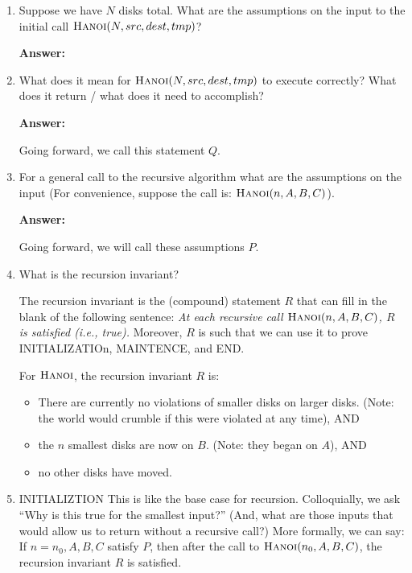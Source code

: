 \documentclass{article}
\newcommand{\answer}{\textbf{Answer:}\vspace{1.8in}}
\begin{document}
\begin{enumerate}
    \item Suppose we have $N$ disks total. What are the assumptions on the input
        to the initial call $\textsc{Hanoi}(N,src,dest,tmp)$?

        \answer

    \item What does it mean for $\textsc{Hanoi}(N,src,dest,tmp)$ to execute
        correctly? What does it return / what does it need to accomplish?

        \answer

        Going forward, we call this statement $Q$.

    \pagebreak
    \item For a general call to the recursive algorithm what are the assumptions on the input
        (For convenience, suppose the call is: $\textsc{Hanoi}(n,A,B,C)$).

        \answer

        Going forward, we will call these assumptions $P$.

    \item What is the recursion invariant?

        The recursion invariant is the (compound) statement $R$ that can fill in
        the blank of the following sentence:
        \emph{At each recursive call $\textsc{Hanoi}(n,A,B,C)$,
        $R$ is satisfied (i.e., true).}  Moreover, $R$ is such that we can use
        it to prove INITIALIZATIOn, MAINTENCE, and END.

        For $\textsc{Hanoi}$, the recursion invariant $R$ is:
        \begin{itemize}
            \item There are currently no violations of smaller disks on larger
                disks. (Note: the world would crumble if this were violated at
                any time), AND
            \item the $n$ smallest disks are now on $B$. (Note: they began on
                $A$), AND
            \item no other disks have moved.
        \end{itemize}

    \item INITIALIZTION This is like the base case for recursion.  Colloquially,
        we ask ``Why is this
        true for the smallest input?'' (And, what are those inputs that
        would allow us to return without a recursive call?)  More formally, we
        can say: If $n=n_0,A,B,C$ satisfy $P$, then after the call to
        $\textsc{Hanoi}(n_0,A,B,C)$, the recursion invariant $R$ is satisfied.


\end{enumerate}
\end{document}

